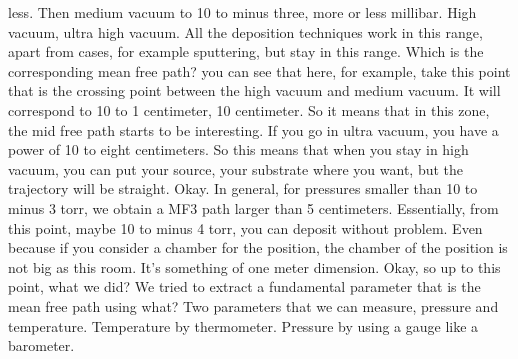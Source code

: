less. Then medium vacuum to 10 to minus three, more or less millibar. High vacuum, ultra high vacuum. All the deposition techniques work in this range, apart from cases, for example sputtering, but stay in this range. Which is the corresponding mean free path? you can see that here, for example, take this point that is the crossing point between the high vacuum and medium vacuum. It will correspond to 10 to 1 centimeter, 10 centimeter. So it means that in this zone, the mid free path starts to be interesting. If you go in ultra vacuum, you have a power of 10 to eight centimeters. So this means that when you stay in high vacuum, you can put your source, your substrate where you want, but the trajectory will be straight. Okay. In general, for pressures smaller than 10 to minus 3 torr, we obtain a MF3 path larger than 5 centimeters. Essentially, from this point, maybe 10 to minus 4 torr, you can deposit without problem. Even because if you consider a chamber for the position, the chamber of the position is not big as this room. It's something of one meter dimension. Okay, so up to this point, what we did? We tried to extract a fundamental parameter that is the mean free path using what? Two parameters that we can measure, pressure and temperature. Temperature by thermometer. Pressure by using a gauge like a barometer.
